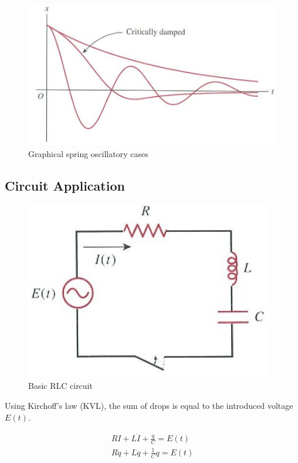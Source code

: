 \begin{figure}[H]
    \centering
    \includegraphics[scale=0.6]{figures/Screen Shot 2021-12-12 at 6.18.51 PM.png}
    \caption{Graphical spring oscillatory cases}
\end{figure}

\subsection{Circuit Application}

\begin{figure}[H]
    \centering
    \includegraphics[]{figures/RLC.png}
    \caption{Basic RLC circuit}
\end{figure}

Using Kirchoff's law (KVL), the sum of drops is equal to the introduced voltage $E(t)$.

\begin{align*}
    RI+L\dot I+\frac{q}{C}=E(t)\\
    R\dot q+L\ddot q+\frac{1}{C}q=E(t)
\end{align*}

